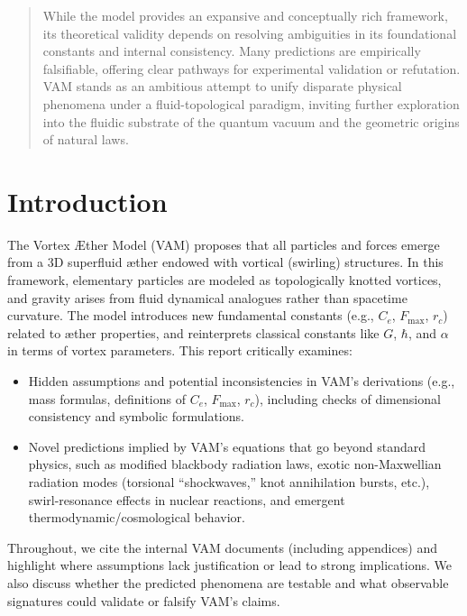 \documentclass[a4paper,12pt]{article}
\begin{document}
\begin{titlepage}
\begin{abstract}
While the model provides an expansive and conceptually rich framework, its theoretical validity depends on resolving ambiguities in its foundational constants and internal consistency. Many predictions are empirically falsifiable, offering clear pathways for experimental validation or refutation. VAM stands as an ambitious attempt to unify disparate physical phenomena under a fluid-topological paradigm, inviting further exploration into the fluidic substrate of the quantum vacuum and the geometric origins of natural laws.
\end{abstract}
       \vfill
    \end{titlepage}
\newpage
    \tableofcontents


\section*{Introduction}

    The Vortex Æther Model (VAM) proposes that all particles and forces emerge from a 3D superfluid æther endowed with vortical (swirling) structures. In this framework, elementary particles are modeled as topologically knotted vortices, and gravity arises from fluid dynamical analogues rather than spacetime curvature. The model introduces new fundamental constants (e.g., $C_e$, $F_{\max}$, $r_c$) related to æther properties, and reinterprets classical constants like $G$, $\hbar$, and $\alpha$ in terms of vortex parameters. This report critically examines:

\begin{itemize}
        \item Hidden assumptions and potential inconsistencies in VAM’s derivations (e.g., mass formulas, definitions of $C_e$, $F_{\max}$, $r_c$), including checks of dimensional consistency and symbolic formulations.
        \item Novel predictions implied by VAM’s equations that go beyond standard physics, such as modified blackbody radiation laws, exotic non-Maxwellian radiation modes (torsional ``shockwaves,'' knot annihilation bursts, etc.), swirl-resonance effects in nuclear reactions, and emergent thermodynamic/cosmological behavior.
\end{itemize}

Throughout, we cite the internal VAM documents (including appendices) and highlight where assumptions lack justification or lead to strong implications. We also discuss whether the predicted phenomena are testable and what observable signatures could validate or falsify VAM’s claims.
\end{document}

